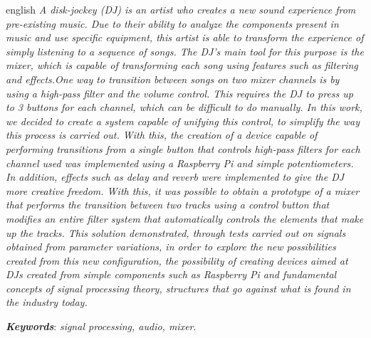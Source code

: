 \begin{resumo}[Abstract]
  \begin{otherlanguage*}{english}
  \textit{A disk-jockey (DJ) is an artist who creates a new sound experience from pre-existing music. Due to their ability to analyze the components present in music and use specific equipment, this artist is able to transform the experience of simply listening to a sequence of songs.
The DJ's main tool for this purpose is the mixer, which is capable of transforming each song using features such as filtering and effects.One way to transition between songs on two mixer channels is by using a high-pass filter and the volume control. This requires the DJ to press up to 3 buttons for each channel, which can be difficult to do manually. In this work, we decided to create a system capable of unifying this control, to simplify the way this process is carried out. With this, the creation of a device capable of performing transitions from a single button that controls high-pass filters for each channel used was implemented using a Raspberry Pi and simple potentiometers. In addition, effects such as delay and reverb were implemented to give the DJ more creative freedom. With this, it was possible to obtain a prototype of a mixer that performs the transition between two tracks using a control button that modifies an entire filter system that automatically controls the elements that make up the tracks. This solution demonstrated, through tests carried out on signals obtained from parameter variations, in order to explore the new possibilities created from this new configuration, the possibility of creating devices aimed at DJs created from simple components such as Raspberry Pi and fundamental concepts of signal processing theory, structures that go against what is found in the industry today.}

\textbf{\textit{Keywords}}: \textit{signal processing, audio, mixer}.
  \end{otherlanguage*}
 \end{resumo}
 